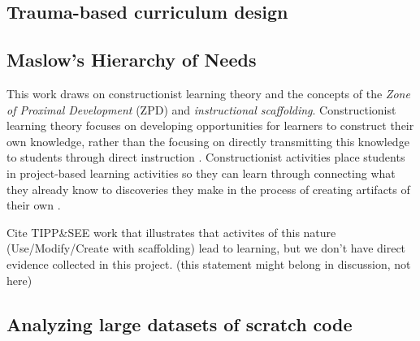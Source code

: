 \documentclass[sigconf,manuscript,review,anonymous]{acmart} %
\begin{document}
\subsection{Trauma-based curriculum design}

\subsection{Maslow's Hierarchy of Needs}


This work draws on constructionist learning theory and the concepts of the \textit{Zone of Proximal Development} (ZPD) and \textit{instructional scaffolding}. Constructionist learning theory focuses on developing opportunities for learners to construct their own knowledge, rather than the focusing on directly transmitting this knowledge to students through direct instruction \cite{Papert:1980}. Constructionist activities place students in project-based learning activities so they can learn through connecting what they already know to discoveries they make in the process of creating artifacts of their own \cite{papert1991situating, papert1993children}. %

Cite TIPP\&SEE work that illustrates that activites of this nature (Use/Modify/Create with scaffolding) lead to learning, but we don't have direct evidence collected in this project. (this statement might belong in discussion, not here) 

\subsection{Analyzing large datasets of scratch code}

\cite{aivaloglou2016kids}
\cite{aivaloglou2017dataset}
\cite{yang2015uncovering}
\cite{fields2014programming}
\cite{dasgupta2016remixing}
\cite{robles2017software}
\end{document}
